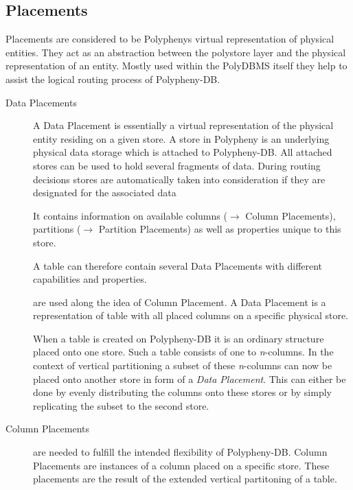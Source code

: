 

\subsection{Placements}
Placements are considered to be Polyphenys virtual representation of physical entities.
They act as an abstraction between the polystore layer and the physical representation of an entity. 
Mostly used within the PolyDBMS itself they help to assist the logical routing process of Polypheny-DB.


\begin{description}
    \item [Data Placements] A Data Placement is essentially a virtual representation of the physical entity residing on a given store.
    A store in Polypheny is an underlying physical data storage which is 
    attached to Polypheny-DB.
    All attached stores can be used to hold several fragments of data. 
    During routing decisions stores are automatically taken into consideration if they are designated for the associated data 
    
    It contains information on available columns ($\rightarrow$ Column Placements), partitions ($\rightarrow$ Partition Placements)
    as well as properties unique to this store.
    
    A table can therefore contain several Data Placements with different capabilities and properties. 
    
    are used along the idea of Column Placement. A Data Placement 
        is a representation of table with all placed columns on a specific physical store.
    
        When a table is created on Polypheny-DB it is an ordinary structure placed onto 
        one store. Such a table consists of one to \textit{n}-columns.
        In the context of vertical partitioning a subset of these \textit{n}-columns can now 
        be placed onto another store in form of a \textit{Data Placement}.
        This can either be done by evenly distributing the columns onto these stores 
        or by simply replicating the subset to the second store.\\

    \item [Column Placements] 
    are needed to fulfill the intended flexibility of Polypheny-DB. 
        Column Placements are instances of a column placed on a specific store.
        These placements are the result of the extended vertical partitoning of a table.
        

\end{description}
